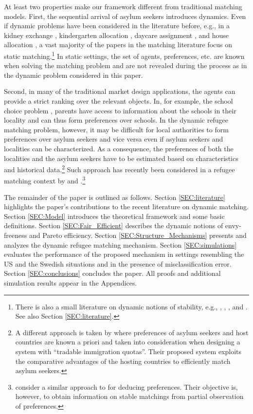 \documentclass[12pt,fleqn]{article}
\begin{document}
At least two properties make our framework different from traditional matching models. First, the sequential arrival of asylum seekers introduces dynamics. Even if dynamic problems have been considered in the literature before, e.g., in a kidney exchange \citep{bib:Unver}, kindergarten allocation \citep{bib:KennesEtAl2014}, daycare assignment \citep{bib:KennesEtAl2014}, and house allocation \citep{bib:BlochCantala,bib:Kurino}, a vast majority of the papers in the matching literature focus on static matching.\footnote{There is also a small literature on dynamic notions of stability, e.g., \citet{bib:DamianoLam}, \citet{bib:Gudmundsson}, \citet{bib:KadamEtAl2018b}, and \citet{bib:Kurino}. See also Section \ref{SEC:literature}.} In static settings, the set of agents, preferences, etc. are known when solving the matching problem and are not revealed during the process as in the dynamic problem considered in this paper.

Second, in many of the traditional market design applications, the agents can provide a strict ranking over the relevant objects. In, for example, the school choice problem \citep{bib:AbdulkadirougluSonmez}, parents have access to information about the schools in their locality and can thus form preferences over schools. In the dynamic refugee matching problem, however, it may be difficult for local authorities to form preferences over asylum seekers and vice versa even if asylum seekers and localities can be characterized. As a consequence, the preferences of both the localities and the asylum seekers have to be estimated based on characteristics and historical data.\footnote{A different approach is taken by \citet{bib:MoragaEtAl} where preferences of asylum seekers and host countries are known a priori and taken into consideration when designing a system with ``tradable immigration quotas''. Their proposed system exploits the comparative advantages of the hosting countries to efficiently match asylum seekers.} Such approach has recently been considered in a refugee matching context by \citet{bib:AnderssonEhlers} and \citet{bib:BansakEtAl}.\footnote{\citet{bib:HaeringerIehle} consider a similar approach to \citet{bib:AnderssonEhlers} for deducing preferences. Their objective is, however, to obtain information on stable matchings from partial observation of preferences.}

The remainder of the paper is outlined as follows. Section \ref{SEC:literature} highlights the paper's contributions to the recent literature on dynamic matching. Section \ref{SEC:Model} introduces the theoretical framework and some basic definitions. Section \ref{SEC:Fair_Efficient} describes the dynamic notions of envy-freeness and Pareto efficiency. Section \ref{SEC:Structure_Mechanisms} presents and analyzes the dynamic refugee matching mechanism. Section \ref{SEC:simulations} evaluates the performance of the proposed mechanism in settings resembling the US and the Swedish situations and in the presence of misclassification error. Section \ref{SEC:conclusions} concludes the paper. All proofs and additional simulation results appear in the Appendices.
\end{document}
